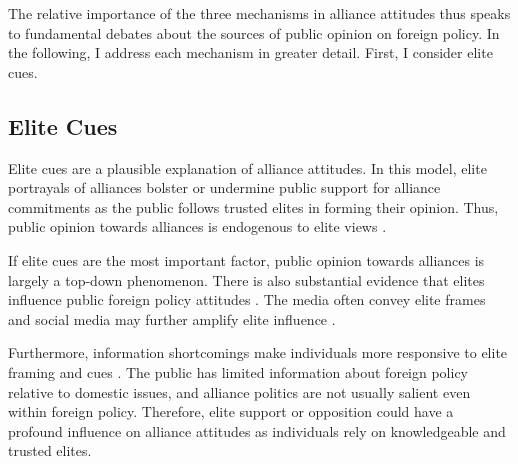 \documentclass[12pt]{article}
\begin{document}


The relative importance of the three mechanisms in alliance attitudes thus speaks to fundamental debates about the sources of public opinion on foreign policy.  
In the following, I address each mechanism in greater detail. 
First, I consider elite cues.


\subsection{Elite Cues} 

Elite cues are a plausible explanation of alliance attitudes. 
In this model, elite portrayals of alliances bolster or undermine public support for alliance commitments as the public follows trusted elites in forming their opinion.
Thus, public opinion towards alliances is endogenous to elite views \citep{Druckman2014}.


If elite cues are the most important factor, public opinion towards alliances is largely a top-down phenomenon.
There is also substantial evidence that elites influence public foreign policy attitudes \citep{BaumPotter2008}. 
The media often convey elite frames and social media may further amplify elite influence \citep{BaumPotter2019}.   


Furthermore, information shortcomings make individuals more responsive to elite framing and cues \citep{Druckman2001, Peterson2017}.  
The public has limited information about foreign policy relative to domestic issues, and alliance politics are not usually salient even within foreign policy. 
Therefore, elite support or opposition could have a profound influence on alliance attitudes as individuals rely on knowledgeable and trusted elites. 
\end{document}
